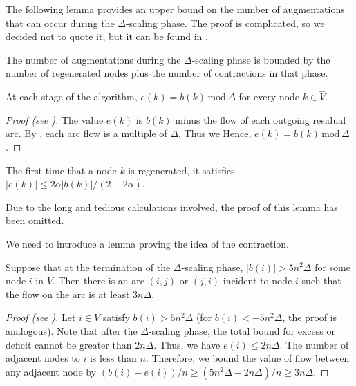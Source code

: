 The following lemma provides an upper bound on the number of augmentations that can occur during the $\Delta$-scaling phase. The proof is complicated, so we decided not to quote it, but it can be found in \cite{orlin1993faster}.

\begin{lemma} \label{lem:augmentation_bound}
    The number of augmentations during the $\Delta$-scaling phase is bounded by the number of regenerated nodes plus the number of contractions in that phase.
\end{lemma}



\begin{lemma} 
At each stage of the algorithm, $e(k) = b(k)\, \text{mod}\,\Delta$ for every node $k\in \hat{V}$.
\end{lemma}

\begin{proof}[Proof (see {\cite[p.~346]{orlin1993faster}})]
    The value $e(k)$ is $b(k)$ minus the flow of each outgoing residual arc. By , each arc flow is a multiple of $\Delta$. Thus we Hence, $e(k) = b(k)\, \text{mod}\, \Delta$.
\end{proof}

\begin{lemma} \label{lem:regenerated_inequality}
    The first time that a node $k$ is regenerated, it satisfies $|e(k)| \leq 2\alpha|b(k)|/(2-2\alpha)$.
\end{lemma}
Due to the long and tedious calculations involved, the proof of this lemma has been omitted.

We need to introduce a lemma proving the idea of the contraction.

\begin{lemma} \label{lem:contraction_bound}
Suppose that at the termination of the $\Delta$-scaling phase, $|b(i)| > 5n^2\Delta$ for some node $i$ in $V$. Then there is an arc $(i,j)$ or $(j,i)$ incident to node $i$ such that the flow on the arc is at least $3n\Delta$.
\end{lemma}

\begin{proof}[Proof (see {\cite[p.344]{orlin1993faster}})]
Let $i\in V$ satisfy $b(i) > 5n^2\Delta$ (for $b(i) < -5n^2 \Delta$, the proof is analogous). Note that after the $\Delta$-scaling phase, the total bound for excess or deficit cannot be greater than $2n\Delta$. Thus, we have $e(i) \leq 2n\Delta$. The number of adjacent nodes to $i$ is less than $n$. Therefore, we bound the value of flow between any adjacent node by $(b(i) - e(i))/n \geq (5n^2\Delta - 2n\Delta)/n \geq 3n\Delta$.
\end{proof}


